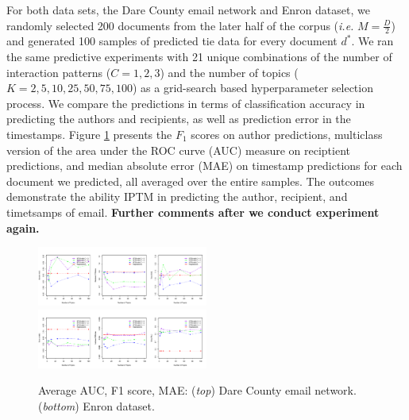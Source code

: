 \documentclass[twoside]{article}
\begin{document}
 For both data sets, the Dare County email network and Enron dataset, we randomly selected 200 documents from the later half of the corpus (\textit{i.e.} $M = \frac{D}{2}$) and generated 100 samples of predicted tie data for every document $d^*$. We ran the same predictive experiments with 21 unique combinations of the number of interaction patterns ($C = 1, 2, 3$) and the number of topics ($K = 2, 5, 10, 25, 50, 75, 100$) as a grid-search based hyperparameter selection process. We compare the predictions in terms of classification accuracy in predicting the authors and recipients, as well as prediction error in the timestamps. Figure \ref{fig:PPE} presents the $F_1$ scores on author predictions, multiclass version of the area under the ROC curve (AUC) measure \citep{hand2001simple} on reciptient predictions, and median absolute error (MAE) on timestamp predictions for each document we predicted, all averaged over the entire samples. The outcomes demonstrate the ability IPTM in predicting the author, recipient, and timetsamps of email. \textbf{Further comments after we conduct experiment again.}
 \begin{figure}[h]
 	\centering
	\includegraphics[width=0.5\textwidth]{plots/Dare_PPE_35.pdf}  
	\includegraphics[width=0.5\textwidth]{plots/Enron_PPE_full.pdf}  
 	\caption{Average AUC, F1 score, MAE: (\textit{top}) Dare County email network. (\textit{bottom}) Enron dataset.}
 	 	\label{fig:PPE}	
 	 \end{figure}
\end{document}
